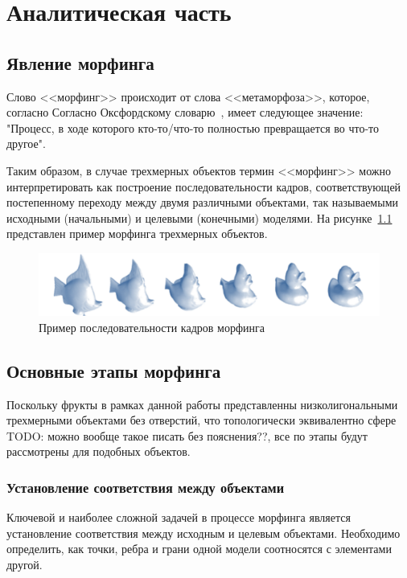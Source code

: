 \chapter{Аналитическая часть}

\section{Явление морфинга}
    Слово <<морфинг>> происходит от слова <<метаморфоза>>, которое, согласно 
    Согласно Оксфордскому словарю~\cite{oxford_dictionary}, имеет следующее значение: "Процесс, в ходе которого кто-то/что-то полностью превращается во что-то другое".

    Таким образом, в случае трехмерных объектов термин <<морфинг>> можно интерпретировать как построение последовательности кадров, соответствующей постепенному переходу между двумя различными
    объектами, так называемыми исходными (начальными) и целевыми (конечными) моделями. На рисунке~\ref{fig:morhping_example} представлен пример морфинга трехмерных объектов.
    
    \begin{figure}[H]
		\centering
    	\includegraphics[width=\textwidth]{../inc/images/morhping_sequence}
    	\caption{Пример последовательности кадров морфинга}
    	\label{fig:morhping_example}  
    \end{figure}

\section{Основные этапы морфинга}
	Поскольку фрукты в рамках данной работы представленны низколигональными трехмерными объектами без отверстий, что топологически эквивалентно сфере TODO: можно вообще такое писать без пояснения??, все по этапы будут рассмотрены для подобных объектов.
	
 
    \subsection{Установление соответствия между объектами}

    Ключевой и наиболее сложной задачей в процессе морфинга является установление соответствия между исходным и целевым объектами. Необходимо определить, как точки, ребра и грани одной модели соотносятся с элементами другой.
    
